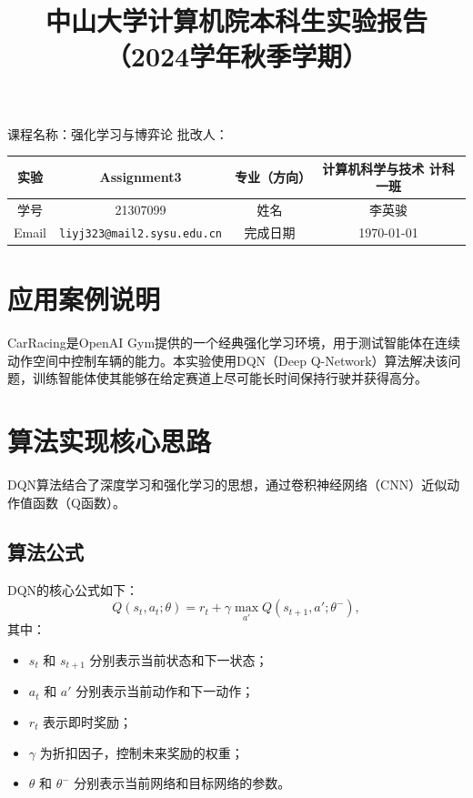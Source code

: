 \documentclass{article}
\title{中山大学计算机院本科生实验报告\\
    （2024学年秋季学期）}
\begin{document}
\maketitle
课程名称：强化学习与博弈论 \qquad\qquad\qquad\qquad\qquad\qquad
批改人：
\begin{table}[h]
    \centering
    \begin{tabular}{|c|c|c|c|} \hline
        实验    & Assignment3                 & 专业（方向） & 计算机科学与技术 计科一班 \\ \hline
        学号    & 21307099                           & 姓名     & 李英骏           \\\hline
        Email & \texttt{liyj323@mail2.sysu.edu.cn} & 完成日期   & \today        \\\hline
    \end{tabular}
\end{table}
\tableofcontents

\newpage

\section{应用案例说明}
CarRacing是OpenAI Gym提供的一个经典强化学习环境，用于测试智能体在连续动作空间中控制车辆的能力。本实验使用DQN（Deep Q-Network）算法解决该问题，训练智能体使其能够在给定赛道上尽可能长时间保持行驶并获得高分。

\section{算法实现核心思路}
DQN算法结合了深度学习和强化学习的思想，通过卷积神经网络（CNN）近似动作值函数（Q函数）。

\subsection{算法公式}
DQN的核心公式如下：
\begin{equation}
Q(s_t, a_t; \theta) = r_t + \gamma \max_{a'} Q(s_{t+1}, a'; \theta^-),
\end{equation}
其中：
\begin{itemize}
    \item $s_t$ 和 $s_{t+1}$ 分别表示当前状态和下一状态；
    \item $a_t$ 和 $a'$ 分别表示当前动作和下一动作；
    \item $r_t$ 表示即时奖励；
    \item $\gamma$ 为折扣因子，控制未来奖励的权重；
    \item $\theta$ 和 $\theta^-$ 分别表示当前网络和目标网络的参数。
\end{itemize}
\end{document}
